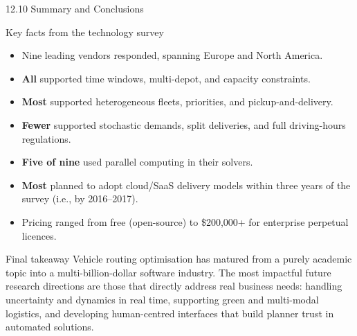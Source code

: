 \documentclass[aspectratio=169,10pt]{beamer}
\begin{document}
\begin{frame}[allowframebreaks]{12.10 \; Summary and Conclusions}
  \begin{block}{Key facts from the technology survey}
    \begin{itemize}
      \item Nine leading vendors responded, spanning Europe and North America.
      \item \textbf{All} supported time windows, multi-depot, and capacity constraints.
      \item \textbf{Most} supported heterogeneous fleets, priorities, and
            pickup-and-delivery.
      \item \textbf{Fewer} supported stochastic demands, split deliveries,
            and full driving-hours regulations.
      \item \textbf{Five of nine} used parallel computing in their solvers.
      \item \textbf{Most} planned to adopt cloud/SaaS delivery models within
            three years of the survey (i.e., by 2016--2017).
      \item Pricing ranged from free (open-source) to \$200,000+ for
            enterprise perpetual licences.
    \end{itemize}
  \end{block}

  \begin{alertblock}{Final takeaway}
    Vehicle routing optimisation has matured from a purely academic topic
    into a multi-billion-dollar software industry.
    The most impactful future research directions are those that directly
    address real business needs: handling uncertainty and dynamics in
    real time, supporting green and multi-modal logistics, and developing
    human-centred interfaces that build planner trust in automated solutions.
  \end{alertblock}

  \framebreak


\end{frame}
\end{document}
